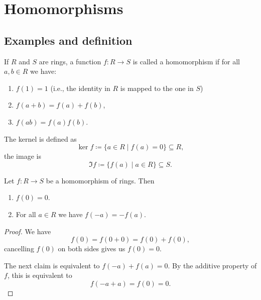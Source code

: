 \documentclass[10pt, a4paper]{article}
\begin{document}
\newpage

\section{Homomorphisms}

\subsection{Examples and definition}

\begin{definition}
    If $R$ and $S$ are rings,
    a function $f : R \to S$ is called a homomorphism if for all $a, b \in R$ we have:
    \begin{enumerate}[label = (\roman*)]
        \item $f(1) = 1$
        (i.e.,
        the identity in $R$ is mapped to the one in $S$)

        \item $f(a + b) = f(a) + f(b)$,

        \item $f(ab) = f(a)f(b)$.
    \end{enumerate}
\end{definition}

The kernel is defined as
\[
\ker{f} \coloneqq \{a \in R\mid f(a) = 0\} \subseteq R,
\]
the image is
\[
\Im{f} \coloneqq \{f(a) \mid a \in R\} \subseteq S.
\]

\begin{lemma}
    Let $f : R \to S$ be a homomorphism of rings.
    Then
    \begin{enumerate}[label = (\roman*)]
        \item $f(0) = 0$.

        \item For all $a \in R$ we have $f(-a) = -f(a)$.
    \end{enumerate}

    \begin{proof}
        We have
        \[
        f(0) = f(0 + 0) = f(0) + f(0),
        \]
        cancelling $f(0)$ on both sides gives us $f(0) = 0$.

        The next claim is equivalent to $f(-a) + f(a) = 0$.
        By the additive property of $f$,
        this is equivalent to
        \[
        f(-a + a) = f(0) = 0.
        \]
    \end{proof}
\end{lemma}
\end{document}

